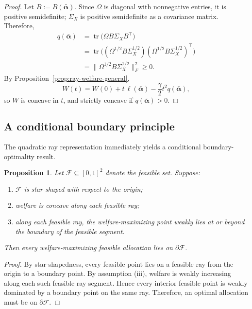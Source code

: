 \documentclass[a4paper,12pt]{article}
\newtheorem{proposition}[theorem]{Proposition}
\theoremstyle{definition}
\theoremstyle{remark}
\newcommand{\1}{\mathbf{1}}
\begin{document}
\begin{proof}
Let \(B:=B(\bar{\boldsymbol{\alpha}})\). Since \(\Omega\) is diagonal with
nonnegative entries, it is positive semidefinite; \(\Sigma_X\) is positive
semidefinite as a covariance matrix. Therefore,
\begin{align*}
q(\bar{\boldsymbol{\alpha}})
&=
\operatorname{tr}\!\bigl(\Omega B\Sigma_X B^\top\bigr) \\
&=
\operatorname{tr}\!\bigl(
(\Omega^{1/2}B\Sigma_X^{1/2})
(\Omega^{1/2}B\Sigma_X^{1/2})^\top
\bigr) \\
&=
\bigl\|\Omega^{1/2}B\Sigma_X^{1/2}\bigr\|_F^2
\ge 0.
\end{align*}
By Proposition~\ref{prop:ray-welfare-general},
\[
W(t)=W(0)+t\,\ell(\bar{\boldsymbol{\alpha}})
-\frac{\gamma}{2}t^2 q(\bar{\boldsymbol{\alpha}}),
\]
so \(W\) is concave in \(t\), and strictly concave if
\(q(\bar{\boldsymbol{\alpha}})>0\).
\end{proof}

\subsection{A conditional boundary principle}

The quadratic ray representation immediately yields a conditional boundary-optimality result.

\begin{proposition}\label{prop:boundary-general}
Let \(\mathcal F\subseteq[0,1]^2\) denote the feasible set. Suppose:
\begin{enumerate}[label=(\roman*), leftmargin=2em]
    \item \(\mathcal F\) is star-shaped with respect to the origin;
    \item welfare is concave along each feasible ray;
    \item along each feasible ray, the welfare-maximizing point weakly lies at or beyond the boundary of the feasible segment.
\end{enumerate}
Then every welfare-maximizing feasible allocation lies on \(\partial \mathcal F\).
\end{proposition}

\begin{proof}
By star-shapedness, every feasible point lies on a feasible ray from the origin to a boundary point. By assumption (iii), welfare is weakly increasing along each such feasible ray segment. Hence every interior feasible point is weakly dominated by a boundary point on the same ray. Therefore, an optimal allocation must be on \(\partial\mathcal F\).
\end{proof}
\end{document}
